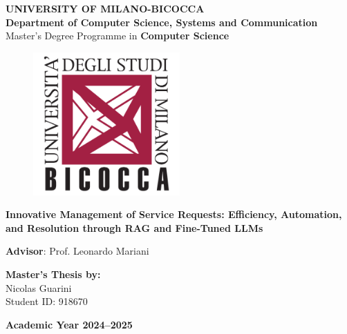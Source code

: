 \begin{titlepage}

\begin{center}
    \normalsize{\textbf{UNIVERSITY OF MILANO-BICOCCA}} \\
    \vspace{3mm}
    \normalsize{\textbf{Department of Computer Science, Systems and Communication}} \\
    \vspace{3mm}
    \normalsize{Master's Degree Programme in \textbf{Computer Science}} \\
    \vspace{13mm}
\end{center}

\begin{figure}[!htb]
    \centering
    \includegraphics[width=5.6cm]{images/logo bicocca.png}
\end{figure}

\vspace{20mm}
\begin{center}

    \Large{\textbf{Innovative Management of Service Requests: Efficiency, Automation, and Resolution through RAG and Fine-Tuned LLMs}}
\end{center}

\vspace*{\fill}

\begin{flushleft}
    \textbf{Advisor}: Prof. Leonardo Mariani
\end{flushleft}

\vspace{10mm}

\begin{flushright}
    \textbf{Master’s Thesis by:} \\
    Nicolas Guarini \\
    Student ID: 918670
\end{flushright}

\vspace{15mm}

\begin{center}
    \normalsize{\textbf{Academic Year 2024–2025}}
\end{center}

\end{titlepage}

